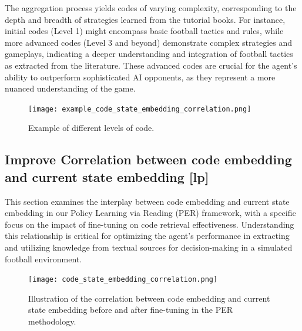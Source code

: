 The aggregation process yields codes of varying complexity, corresponding to the depth and breadth of strategies learned from the tutorial books. For instance, initial codes (Level 1) might encompass basic football tactics and rules, while more advanced codes (Level 3 and beyond) demonstrate complex strategies and gameplays, indicating a deeper understanding and integration of football tactics as extracted from the literature. These advanced codes are crucial for the agent's ability to outperform sophisticated AI opponents, as they represent a more nuanced understanding of the game.


\begin{figure}[ht]
\centering
\texttt{[image: example\_code\_state\_embedding\_correlation.png]}
\caption{Example of different levels of code.}
\label{fig:code_state_embedding}
\end{figure}



\subsection{Improve Correlation between code embedding and current state embedding  [lp]}

This section examines the interplay between code embedding and current state embedding in our Policy Learning via Reading (PER) framework, with a specific focus on the impact of fine-tuning on code retrieval effectiveness. Understanding this relationship is critical for optimizing the agent's performance in extracting and utilizing knowledge from textual sources for decision-making in a simulated football environment.

\begin{figure}[ht]
\centering
\texttt{[image: code\_state\_embedding\_correlation.png]}
\caption{Illustration of the correlation between code embedding and current state embedding before and after fine-tuning in the PER methodology.}
\label{fig:code_state_embedding}
\end{figure}


